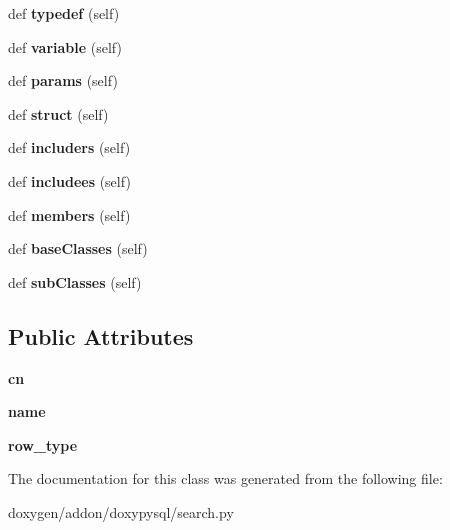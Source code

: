 \begin{DoxyCompactItemize}
def {\bfseries typedef} (self)
\item 
\mbox{\label{classsearch_1_1_finder_a5020818024b6b57996d00916a3988fa4}} 
def {\bfseries variable} (self)
\item 
\mbox{\label{classsearch_1_1_finder_a4411ca41245350dcc2d15f557207d158}} 
def {\bfseries params} (self)
\item 
\mbox{\label{classsearch_1_1_finder_ae046264300f10978b47e3bee2f045def}} 
def {\bfseries struct} (self)
\item 
\mbox{\label{classsearch_1_1_finder_af94d5fa88039afea407be1dd16494202}} 
def {\bfseries includers} (self)
\item 
\mbox{\label{classsearch_1_1_finder_a299475bb87c0430d8dbe5210cdfc8e50}} 
def {\bfseries includees} (self)
\item 
\mbox{\label{classsearch_1_1_finder_a05dfcc9ef6fcb4a9803bcb5c3c721724}} 
def {\bfseries members} (self)
\item 
\mbox{\label{classsearch_1_1_finder_a09653f41757950301ab0bcc79b38a13c}} 
def {\bfseries base\+Classes} (self)
\item 
\mbox{\label{classsearch_1_1_finder_a03dab536e0a659c517c9b631f2a91ed8}} 
def {\bfseries sub\+Classes} (self)
\end{DoxyCompactItemize}
\subsection*{Public Attributes}
\begin{DoxyCompactItemize}
\item 
\mbox{\label{classsearch_1_1_finder_ac6a8b17c71b98598243ff34d7a4b33ba}} 
{\bfseries cn}
\item 
\mbox{\label{classsearch_1_1_finder_a9c38c51eda604105c8886598d3f66671}} 
{\bfseries name}
\item 
\mbox{\label{classsearch_1_1_finder_a4dcf196b0e5483688388226f8bdff332}} 
{\bfseries row\+\_\+type}
\end{DoxyCompactItemize}


The documentation for this class was generated from the following file\+:\begin{DoxyCompactItemize}
\item 
doxygen/addon/doxypysql/search.\+py\end{DoxyCompactItemize}
